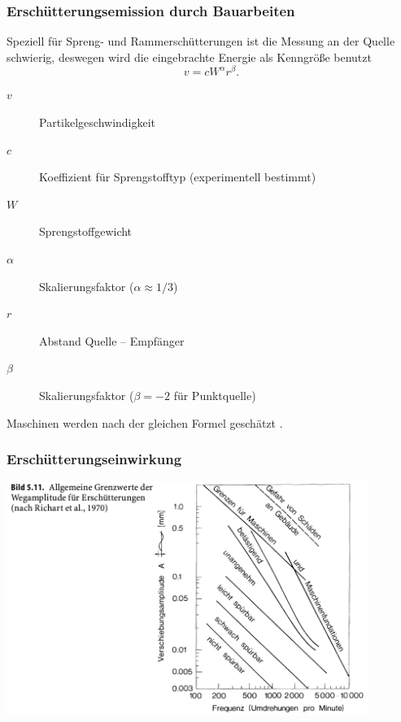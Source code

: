 \begin{frame}
\frametitle{Erschütterungsemission {\normalsize durch Bauarbeiten}}
Speziell für Spreng- und Rammerschütterungen \cite{studer2008bodendynamik} ist die Messung an der Quelle schwierig, deswegen wird die eingebrachte Energie als Kenngröße benutzt
\begin{equation*}
 v=cW^\alpha r^\beta.
\end{equation*}
\begin{description}
 \item[$v$] Partikelgeschwindigkeit
 \item[$c$] Koeffizient für Sprengstofftyp (experimentell bestimmt)
 \item[$W$] Sprengstoffgewicht
 \item[$\alpha$] Skalierungsfaktor ($\alpha\approx1/3$)
 \item[$r$] Abstand Quelle -- Empfänger
 \item[$\beta$] Skalierungsfaktor ($\beta=-2$ für Punktquelle)
\end{description}
Maschinen werden nach der gleichen Formel geschätzt \cite{studer2008bodendynamik}.
\end{frame}


\begin{frame}
\frametitle{Erschütterungseinwirkung} %
\includegraphics[width=0.88\textwidth]{fig_img/grenzwerte} 
\end{frame}

